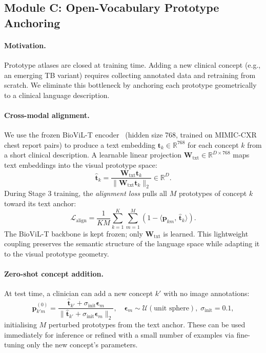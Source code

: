 \documentclass{article}
\begin{document}
\subsection{Module C: Open-Vocabulary Prototype Anchoring}
\label{sec:vlm}

\paragraph{Motivation.}
Prototype atlases are closed at training time. Adding a new clinical concept (e.g., an emerging TB variant) requires collecting annotated data and retraining from scratch. We eliminate this bottleneck by anchoring each prototype geometrically to a clinical language description.

\paragraph{Cross-modal alignment.}
We use the frozen BioViL-T encoder~\cite{bannur2023biovilt} (hidden size 768, trained on MIMIC-CXR chest report pairs) to produce a text embedding $\mathbf{t}_k \in \mathbb{R}^{768}$ for each concept $k$ from a short clinical description. A learnable linear projection $\mathbf{W}_{\text{txt}} \in \mathbb{R}^{D \times 768}$ maps text embeddings into the visual prototype space:
\begin{equation}
    \hat{\mathbf{t}}_k = \frac{\mathbf{W}_{\text{txt}}\mathbf{t}_k}{\|\mathbf{W}_{\text{txt}}\mathbf{t}_k\|_2} \in \mathbb{R}^D.
\end{equation}
During Stage 3 training, the \emph{alignment loss} pulls all $M$ prototypes of concept $k$ toward its text anchor:
\begin{equation}
    \mathcal{L}_\text{align} = \frac{1}{KM} \sum_{k=1}^K \sum_{m=1}^M \left(1 - \langle \mathbf{p}_{km},\, \hat{\mathbf{t}}_k \rangle\right).
    \label{eq:align_loss}
\end{equation}
The BioViL-T backbone is kept frozen; only $\mathbf{W}_{\text{txt}}$ is learned. This lightweight coupling preserves the semantic structure of the language space while adapting it to the visual prototype geometry.

\paragraph{Zero-shot concept addition.}
At test time, a clinician can add a new concept $k'$ with no image annotations:
\begin{equation}
    \mathbf{p}_{k'm}^{(0)} = \frac{\hat{\mathbf{t}}_{k'} + \sigma_{\text{init}}\boldsymbol{\epsilon}_m}{\|\hat{\mathbf{t}}_{k'} + \sigma_{\text{init}}\boldsymbol{\epsilon}_m\|_2}, \quad \boldsymbol{\epsilon}_m \sim \mathcal{U}(\text{unit sphere}),\; \sigma_{\text{init}} = 0.1,
\end{equation}
initialising $M$ perturbed prototypes from the text anchor. These can be used immediately for inference or refined with a small number of examples via fine-tuning only the new concept's parameters.
\end{document}
